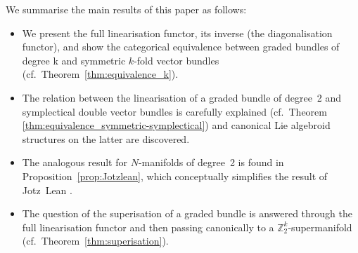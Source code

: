 \documentclass[pdftex]{sigma}
\numberwithin{equation}{section}
\begin{document}
We summarise the main results of this paper as follows:
\begin{itemize}\itemsep=0pt
\item We present the full linearisation functor, its inverse (the diagonalisation functor), and show the categorical equivalence between graded bundles of degree k and symmetric $k$-fold vector bundles (cf.~Theorem~\ref{thm:equivalence_k}).
\item The relation between the linearisation of a graded bundle of degree~2 and symplectical double vector bundles is carefully explained (cf.~Theorem \ref{thm:equivalence_symmetric-symplectical}) and canonical Lie algebroid structures on the latter are discovered.
\item The analogous result for $N$-manifolds of degree~2 is found in Proposition~\ref{prop:Jotzlean}, which conceptually simplif\/ies the result of Jotz~Lean \cite[Theorem~3.17]{JotzLean:2015}.
\item The question of the superisation of a graded bundle is answered through the full linearisation functor and then passing canonically to a $\mathbb{Z}_{2}^{k}$-supermanifold (cf.~Theorem~\ref{thm:superisation}).
\end{itemize}
\end{document}
